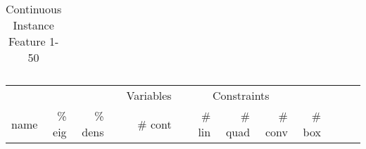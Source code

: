 \begin{table}
\begin{tabular}{lrrrrrrrrrrrr}
														


\bottomrule

\end{tabular}  
\label{tab:B1}
\caption{Continuous  Instance Feature 1-50} 

\end{table}


\begin{table}
 \centering
 \setlength{\tabcolsep}{11pt}
 \renewcommand \arraystretch{1}
\begin{tabular}{lrrrrrrrrrrrr}
\toprule

		&		&		&	&	\multicolumn{1}{c}{Variables}	&	&	\multicolumn{3}{c}{Constraints}							\\
\cmidrule(lr){5-5} \cmidrule(lr){7-10}																	
name	&	\% eig	&	\% dens	&	&	\# cont 	&	&	\# lin 	&	\# quad 	&	\# conv 	&	\# box	\\
\cmidrule(lr){5-5} \cmidrule(lr){7-10}																	
							

\end{tabular}
\end{table}
